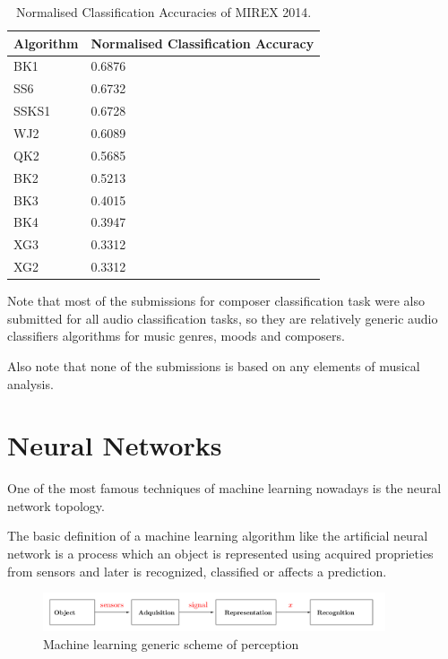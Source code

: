 \documentclass[a4paper,openany,oneside,12pt]{book}
\begin{document}
\begin{table}
\centering
   \begin{tabular}{ | l || l | }
   \hline
   Algorithm & Normalised Classification Accuracy \\ \hline
   BK1 & 0.6876 \\ \hline
   SS6 & 0.6732 \\ \hline
   SSKS1 & 0.6728 \\ \hline
   WJ2 & 0.6089 \\ \hline
   QK2 & 0.5685 \\ \hline
   BK2 & 0.5213 \\ \hline
   BK3 & 0.4015 \\ \hline
   BK4 & 0.3947 \\ \hline
   XG3 & 0.3312 \\ \hline
   XG2 & 0.3312 \\ \hline
   \end{tabular}

\caption{Normalised Classification Accuracies of MIREX 2014.\cite{resultsMirex14}} \label{fig:MIREX14results}
\end{table}

Note that most of the submissions for composer classification task were also submitted for all audio classification tasks, so they are relatively generic audio classifiers algorithms for music genres, moods and composers.

Also note that none of the submissions is based on any elements of musical analysis.

\section{Neural Networks}


One of the most famous techniques of machine learning nowadays is the neural network topology.

The basic definition of a machine learning algorithm like the artificial neural network is a process which an object is represented using acquired proprieties from sensors and later is recognized, classified or affects a prediction.

\begin{figure}
\centering
\includegraphics[width=0.9\textwidth]{img/machinelearning.png} 
\caption{Machine learning generic scheme of perception\cite{rparedesNN}} \label{fig:machinelearning}
\end{figure}
\end{document}

